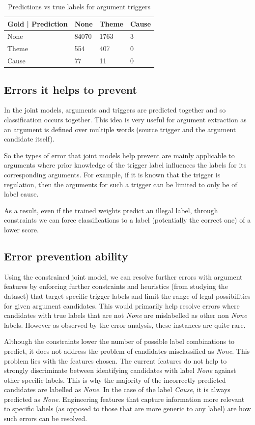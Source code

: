 \documentclass{article} %
\begin{document}
\begin{table}[htb]
\centering
\caption{Predictions vs true labels for argument triggers}
\label{table:args_results}
\begin{tabular}{|l|l|l|l|}
\hline
Gold | Prediction & None & Theme & Cause \\ \hline
None & 84070 & 1763 & 3 \\ \hline
Theme & 554 & 407 & 0 \\ \hline
Cause & 77 & 11 & 0 \\ \hline
\end{tabular}
\end{table}

\subsection{Errors it helps to prevent}
In the joint models, arguments and triggers are predicted together and so classification occurs together. This idea is very useful for argument extraction as an argument is defined over multiple words (source trigger and the argument candidate itself).

So the types of error that joint models help prevent are mainly applicable to arguments where prior knowledge of the trigger label influences the labels for its corresponding arguments. For example, if it is known that the trigger is regulation, then the arguments for such a trigger can be limited to only be of label cause. 

As a result, even if the trained weights predict an illegal label, through constraints we can force classifications to a label (potentially the correct one) of a lower score.


\subsection{Error prevention ability}
Using the constrained joint model, we can resolve further errors with argument features by enforcing further constraints and heuristics (from studying the dataset) that target specific trigger labels and limit the range of legal possibilities for given argument candidates. This would primarily help resolve errors where candidates with true labels that are not \emph{None} are mislabelled as other non \emph{None} labels. However as observed by the error analysis, these instances are quite rare. 

Although the constraints lower the number of possible label combinations to predict, it does not address the problem of candidates misclassified as \emph{None}. This problem lies with the features chosen. The current features do not help to strongly discriminate between identifying candidates with label \emph{None} against other specific labels. This is why the majority of the incorrectly predicted candidates are labelled as \emph{None}. In the case of the label \emph{Cause}, it is always predicted as \emph{None}. Engineering features that capture information more relevant to specific labels (as opposed to those that are more generic to any label) are how such errors can be resolved.
\end{document}
